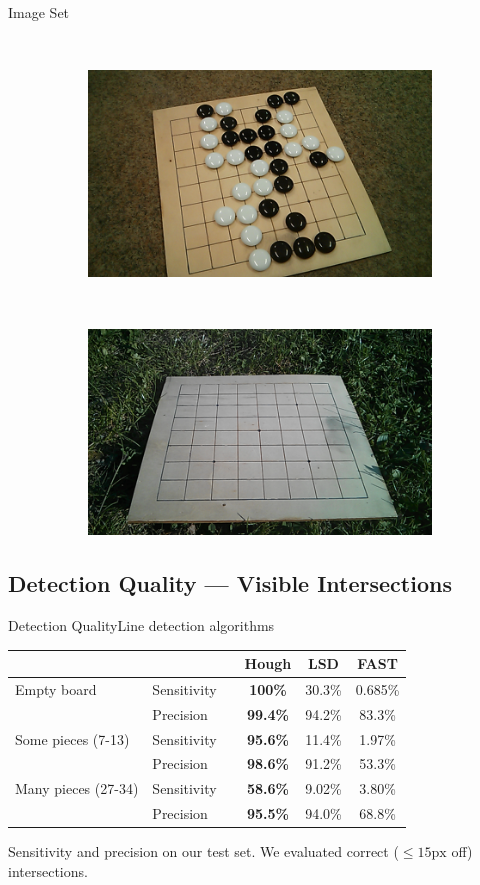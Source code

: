 \documentclass[table]{beamer}
\begin{document}
\begin{frame}{Image Set}
\begin{figure}
\begin{subfigure}{}
		\end{subfigure}
		~
		\begin{subfigure}{}
				\includegraphics[width=0.3\columnwidth]{images/neonFloor_many_centerLow_rotated.png}
		\end{subfigure}
		~
		\begin{subfigure}{}
			\includegraphics[width=0.3\columnwidth]{images/sunnyGrass_empty_centerLow.png}
		\end{subfigure}
	\end{figure}

\end{frame}
\subsection{Detection Quality --- Visible Intersections}
\begin{frame}{Detection Quality}{Line detection algorithms}
	\begin{table}
		\centering
		\begin{tabular}{llc>{\bfseries}ccc}
		    \multicolumn{2}{c}{}									&\hphantom{A} & Hough 	& LSD 		& FAST     \\

			\toprule
			Empty board 			   		& Sensitivity 			&& 100\%	& 30.3\%  	& 0.685\%  \\
											& Precision			 	&& 99.4\% 	& 94.2\%  	& 83.3\%  \\
			\midrule
			Some pieces (7-13)				& Sensitivity	 		&& 95.6\% 	& 11.4\% 	& 1.97\%   \\
											& Precision 			&& 98.6\% 	& 91.2\%  	& 53.3\%  \\
			\midrule
			Many pieces (27-34) 			& Sensitivity		 	&& 58.6\% 	& 9.02\% 	& 3.80\%   \\
											& Precision			 	&& 95.5\% 	& 94.0\%  	& 68.8\%  \\
			\bottomrule
		\end{tabular}
	\end{table}
	Sensitivity and precision on our test set. We evaluated correct ($\leq 15\text{px}$ off) intersections.
\end{frame}
\end{document}
